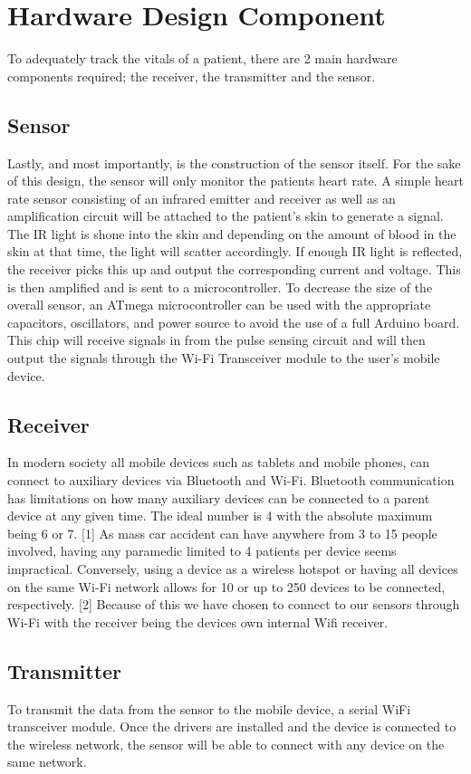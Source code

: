 
\section{Hardware Design Component}

To adequately track the vitals of a patient, there are 2 main hardware components required; the receiver, the transmitter and the sensor.

\subsection{Sensor}
Lastly, and most importantly, is the construction of the sensor itself. For the sake of this design, the sensor will only monitor the patients heart rate. A simple heart rate sensor consisting of an infrared emitter and receiver as well as an amplification circuit will be attached to the patient’s skin to generate a signal. The IR light is shone into the skin and depending on the amount of blood in the skin at that time, the light will scatter accordingly. If enough IR light is reflected, the receiver picks this up and output the corresponding current and voltage. This is then amplified and is sent to a microcontroller.
To decrease the size of the overall sensor, an ATmega microcontroller can be used with the appropriate capacitors, oscillators, and power source to avoid the use of a full Arduino board. This chip will receive signals in from the pulse sensing circuit and will then output the signals through the Wi-Fi Transceiver module to the user’s mobile device.

\subsection{Receiver}
In modern society all mobile devices such as tablets and mobile phones, can connect to auxiliary devices via Bluetooth and Wi-Fi. Bluetooth communication has limitations on how many auxiliary devices can be connected to a parent device at any given time. The ideal number is 4 with the absolute maximum being 6 or 7. [1] As mass car accident can have anywhere from 3 to 15 people involved, having any paramedic limited to 4 patients per device seems impractical. Conversely, using a device as a wireless hotspot or having all devices on the same Wi-Fi network allows for 10 or up to 250 devices to be connected, respectively. [2] Because of this we have chosen to connect to our sensors through Wi-Fi with the receiver being the devices own internal Wifi receiver.

\subsection{Transmitter}
To transmit the data from the sensor to the mobile device, a serial WiFi transceiver module. Once the drivers are installed and the device is connected to the wireless network, the sensor will be able to connect with any device on the same network.
